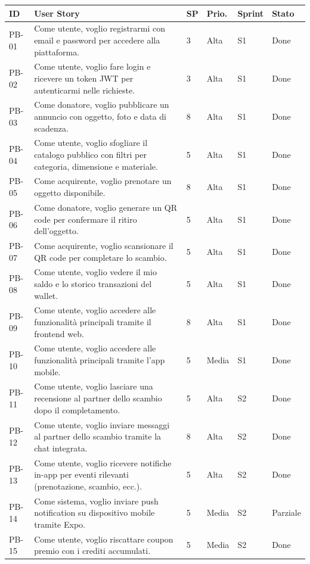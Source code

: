\documentclass[11pt,a4paper]{article}
\begin{document}
\begin{longtable}{L{0.9cm}L{6.5cm}C{1cm}C{1.3cm}C{1.3cm}L{1.8cm}}
\toprule
\textbf{ID} & \textbf{User Story} & \textbf{SP} & \textbf{Prio.} & \textbf{Sprint} & \textbf{Stato} \\
\midrule
\endhead
\bottomrule
\endfoot

PB-01 & Come utente, voglio registrarmi con email e password per accedere alla piattaforma. & 3 & Alta & S1 & Done \\
PB-02 & Come utente, voglio fare login e ricevere un token JWT per autenticarmi nelle richieste. & 3 & Alta & S1 & Done \\
PB-03 & Come donatore, voglio pubblicare un annuncio con oggetto, foto e data di scadenza. & 8 & Alta & S1 & Done \\
PB-04 & Come utente, voglio sfogliare il catalogo pubblico con filtri per categoria, dimensione e materiale. & 5 & Alta & S1 & Done \\
PB-05 & Come acquirente, voglio prenotare un oggetto disponibile. & 8 & Alta & S1 & Done \\
PB-06 & Come donatore, voglio generare un QR code per confermare il ritiro dell'oggetto. & 5 & Alta & S1 & Done \\
PB-07 & Come acquirente, voglio scansionare il QR code per completare lo scambio. & 5 & Alta & S1 & Done \\
PB-08 & Come utente, voglio vedere il mio saldo e lo storico transazioni del wallet. & 5 & Alta & S1 & Done \\
PB-09 & Come utente, voglio accedere alle funzionalità principali tramite il frontend web. & 8 & Alta & S1 & Done \\
PB-10 & Come utente, voglio accedere alle funzionalità principali tramite l'app mobile. & 5 & Media & S1 & Done \\
PB-11 & Come utente, voglio lasciare una recensione al partner dello scambio dopo il completamento. & 5 & Alta & S2 & Done \\
PB-12 & Come utente, voglio inviare messaggi al partner dello scambio tramite la chat integrata. & 8 & Alta & S2 & Done \\
PB-13 & Come utente, voglio ricevere notifiche in-app per eventi rilevanti (prenotazione, scambio, ecc.). & 5 & Alta & S2 & Done \\
PB-14 & Come sistema, voglio inviare push notification su dispositivo mobile tramite Expo. & 5 & Media & S2 & Parziale \\
PB-15 & Come utente, voglio riscattare coupon premio con i crediti accumulati. & 5 & Media & S2 & Done \\

\end{longtable}
\end{document}
